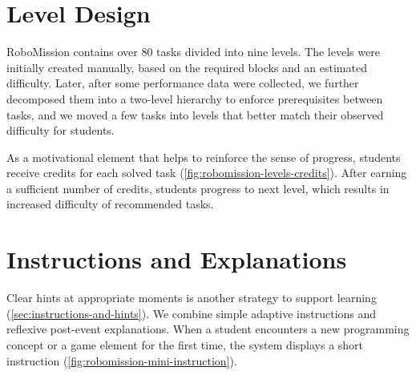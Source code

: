 \section{Level Design}
\label{sec:level-design}


RoboMission contains over 80 tasks divided into nine levels.
The levels were initially created manually, based on the required blocks
and an estimated difficulty. Later, after some performance data
were collected, we further decomposed them into a two-level
hierarchy to enforce prerequisites between tasks, and we moved
a few tasks into levels that better match their observed
difficulty for students.



As a motivational element that helps to reinforce the sense of progress,
students receive credits for each solved task
(\cref{fig:robomission-levels-credits}).
After earning a sufficient number of credits, students progress to next level,
which results in increased difficulty of recommended tasks.



\section{Instructions and Explanations}
\label{sec:game.explanations}

Clear hints at appropriate moments
is another strategy to support learning
(\cref{sec:instructions-and-hints}).
We combine simple adaptive instructions and reflexive post-event explanations.
When a student encounters a new programming concept or a game element
for the first time, the system displays a short instruction
(\cref{fig:robomission-mini-instruction}).


